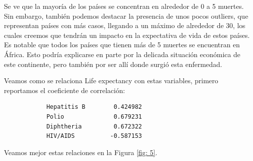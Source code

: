 \begin{itemize}
        Se ve que la mayoría de los países se concentran en alrededor de 0 a 5 muertes. Sin embargo, también podemos destacar la presencia de unos pocos outliers, que representan países con más casos, llegando a un máximo de alrededor de 30, los cuales creemos que tendrán un impacto en la expectativa de vida de estos países. Es notable que todos los países que tienen más de 5 muertes se encuentran en África. Esto podría explicarse en parte por la delicada situación económica de este continente, pero también por ser allí donde surgió esta enfermedad. 

       Veamos como se relaciona Life expectancy con estas variables, primero reportamos el coeficiente de correlación:
       
       \begin{verbatim}
            Hepatitis B        0.424982
            Polio              0.679231
            Diphtheria         0.672322
            HIV/AIDS          -0.587153
       \end{verbatim}
       
       Veamos mejor estas relaciones en la Figura \ref{fig: 5}. 
       

\end{itemize}
